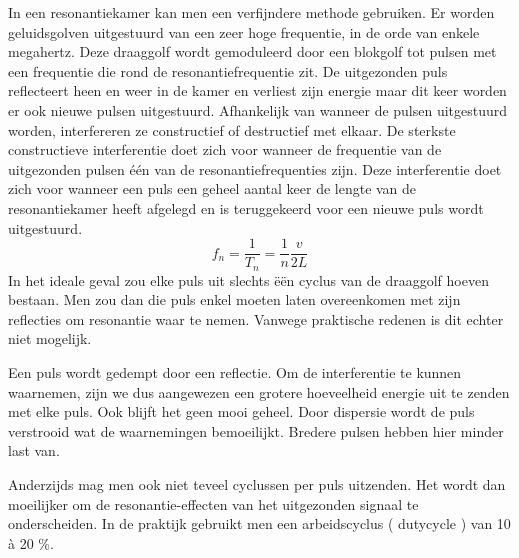 In een resonantiekamer kan men een verfijndere methode gebruiken. Er worden 
geluidsgolven uitgestuurd van een zeer hoge frequentie, in de orde van enkele 
megahertz. Deze draaggolf wordt gemoduleerd door een blokgolf tot pulsen met 
een frequentie die rond de resonantiefrequentie zit. De uitgezonden puls 
reflecteert heen en weer in de kamer en verliest zijn energie maar dit keer 
worden er ook nieuwe pulsen uitgestuurd. Afhankelijk van wanneer de pulsen 
uitgestuurd worden, interfereren ze constructief of destructief met elkaar. De 
sterkste constructieve interferentie doet zich voor wanneer de frequentie van 
de uitgezonden pulsen \'e\'en van de resonantiefrequenties zijn. Deze 
interferentie doet zich voor wanneer een puls een geheel aantal keer de lengte 
van de resonantiekamer heeft afgelegd en is teruggekeerd voor een nieuwe puls 
wordt uitgestuurd.
\begin{equation}
\label{resfreq}
f_n = \frac{1}{T_n} = \frac{1}{n} \frac{v}{2L}
\end{equation}
In het ideale geval zou elke puls uit slechts \"e\"en cyclus van de draaggolf 
hoeven bestaan. Men zou dan die puls enkel moeten laten overeenkomen met zijn 
reflecties om resonantie waar te nemen. Vanwege praktische redenen is dit 
echter niet mogelijk.

Een puls wordt gedempt door een reflectie. Om de interferentie te kunnen 
waarnemen, zijn we dus aangewezen een grotere hoeveelheid energie uit te zenden 
met elke puls. Ook blijft het geen mooi geheel. Door dispersie wordt de puls 
verstrooid wat de waarnemingen bemoeilijkt. Bredere pulsen hebben hier minder 
last van.


Anderzijds mag men ook niet teveel cyclussen per puls uitzenden. Het wordt dan 
moeilijker om de resonantie-effecten van het uitgezonden signaal te 
onderscheiden. In de praktijk gebruikt men een arbeidscyclus ( dutycycle ) van 
10 \`a 20 \%.  





